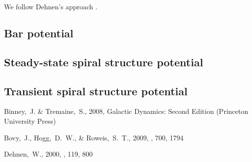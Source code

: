 \documentclass[12pt,preprint]{aastex}
\begin{document}
We follow Dehnen's approach \citep{dehnen00a}.


\subsection{Bar potential}


\subsection{Steady-state spiral structure potential}


\subsection{Transient spiral structure potential}


\begin{thebibliography}{}

{Binney},~J. \& {Tremaine},~S., 2008, {Galactic Dynamics: Second Edition}
  (Princeton University Press)

 Bovy,~J., Hogg,~D.~W., \& Roweis,~S.~T., 2009,
  \apj, 700, 1794

  Dehnen,~W., 2000, \aj, 119, 800

\end{thebibliography}
\end{document}
